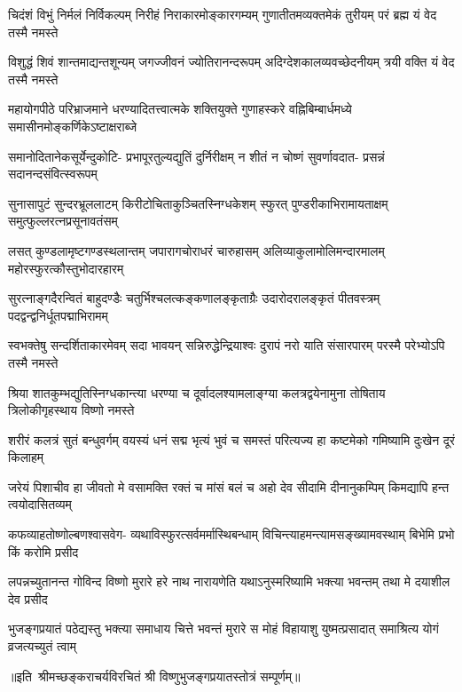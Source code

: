 
\fourlineindentedshloka
{चिदंशं विभुं निर्मलं निर्विकल्पम्‌}
{निरीहं निराकारमोङ्कारगम्यम्‌}
{गुणातीतमव्यक्तमेकं तुरीयम्‌}
{परं ब्रह्म यं वेद तस्मै नमस्ते}%

\fourlineindentedshloka
{विशुद्धं शिवं शान्तमाद्यन्तशून्यम्‌}
{जगज्जीवनं ज्योतिरानन्दरूपम्‌}
{अदिग्देशकालव्यवच्छेदनीयम्‌} 
{त्रयी वक्ति यं वेद तस्मै नमस्ते}%

\fourlineindentedshloka
{महायोगपीठे परिभ्राजमाने} 
{धरण्यादितत्त्वात्मके शक्तियुक्ते}
{गुणाहस्करे वह्निबिम्बार्धमध्ये} 
{समासीनमोङ्कर्णिकेऽष्टाक्षराब्जे}%

\fourlineindentedshloka
{समानोदितानेकसूर्येन्दुकोटि-}
{प्रभापूरतुल्यद्युतिं दुर्निरीक्षम्‌}
{न शीतं न चोष्णं सुवर्णावदात-}
{प्रसन्नं सदानन्दसंवित्स्वरूपम्‌}%

\fourlineindentedshloka
{सुनासापुटं सुन्दरभ्रूललाटम्‌}
{किरीटोचिताकुञ्चितस्निग्धकेशम्‌}
{स्फुरत् पुण्डरीकाभिरामायताक्षम्‌}
{समुत्फुल्लरत्नप्रसूनावतंसम्‌}%

\fourlineindentedshloka
{लसत् कुण्डलामृष्टगण्डस्थलान्तम्‌}
{जपारागचोराधरं चारुहासम्‌}
{अलिव्याकुलामोलिमन्दारमालम्‌}
{महोरस्फुरत्कौस्तुभोदारहारम्‌}%

\fourlineindentedshloka
{सुरत्नाङ्गदैरन्वितं बाहुदण्डैः}
{चतुर्भिश्चलत्कङ्कणालङ्कृताग्रैः}
{उदारोदरालङ्कृतं पीतवस्त्रम्‌}
{पदद्वन्द्वनिर्धूतपद्माभिरामम्‌}%

\fourlineindentedshloka
{स्वभक्तेषु सन्दर्शिताकारमेवम्‌}
{सदा भावयन् सन्निरुद्धेन्द्रियाश्वः}
{दुरापं नरो याति संसारपारम्‌}
{परस्मै परेभ्योऽपि तस्मै नमस्ते}%

\fourlineindentedshloka
{श्रिया शातकुम्भद्युतिस्निग्धकान्त्या}
{धरण्या च दूर्वादलश्यामलाङ्ग्या}
{कलत्रद्वयेनामुना तोषिताय} 
{त्रिलोकीगृहस्थाय विष्णो नमस्ते}%

\fourlineindentedshloka
{शरीरं कलत्रं सुतं बन्धुवर्गम्‌}
{वयस्यं धनं सद्म भृत्यं भुवं च}
{समस्तं परित्यज्य हा कष्टमेको} 
{गमिष्यामि दुःखेन दूरं किलाहम्‌}%

\fourlineindentedshloka
{जरेयं पिशाचीव हा जीवतो मे}
{वसामक्ति रक्तं च मांसं बलं च}
{अहो देव सीदामि दीनानुकम्पिम्}
{किमद्यापि हन्त त्वयोदासितव्यम्‌}%

\fourlineindentedshloka
{कफव्याहतोष्णोल्बणश्वासवेग-}
{व्यथाविस्फुरत्सर्वमर्मास्थिबन्धाम्‌}
{विचिन्त्याहमन्त्यामसङ्ख्यामवस्थाम्}
{बिभेमि प्रभो किं करोमि प्रसीद}%

\fourlineindentedshloka
{लपन्नच्युतानन्त गोविन्द विष्णो}
{मुरारे हरे नाथ नारायणेति}
{यथाऽनुस्मरिष्यामि भक्त्या भवन्तम्‌}
{तथा मे दयाशील देव प्रसीद}%

\fourlineindentedshloka
{भुजङ्गप्रयातं पठेद्यस्तु भक्त्या}
{समाधाय चित्ते भवन्तं मुरारे}
{स मोहं विहायाशु युष्मत्प्रसादात्}
{समाश्रित्य योगं व्रजत्यच्युतं त्वाम्‌}%

॥इति~श्रीमच्छङ्कराचर्यविरचितं श्री विष्णुभुजङ्गप्रयातस्तोत्रं सम्पूर्णम्‌॥ 

